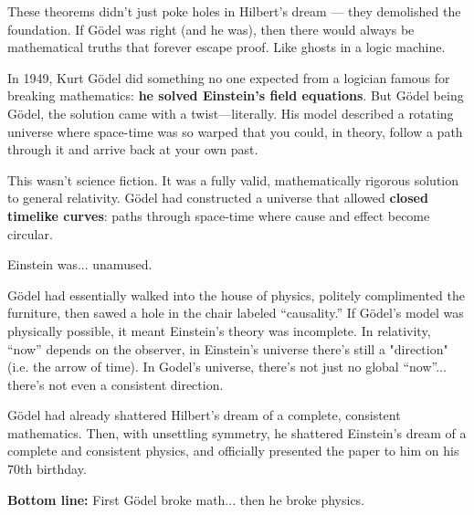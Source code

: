 These theorems didn’t just poke holes in Hilbert’s dream — they demolished the foundation. If Gödel was right (and he was), then there would always be mathematical truths that forever escape proof. Like ghosts in a logic machine.

\medskip

\begin{tcolorbox}[colback=blue!5!white, colframe=blue!50!black,
  title={Historical Sidebar: Gödel’s Time-Twisting Universe}]
  
  In 1949, Kurt Gödel did something no one expected from a logician famous for breaking mathematics:  
  \textbf{he solved Einstein’s field equations}. But Gödel being Gödel, the solution came with a twist—literally. His model described a rotating universe where space-time was so warped that you could, in theory, follow a path through it and arrive back at your own past.
  
  \medskip
  
  This wasn’t science fiction. It was a fully valid, mathematically rigorous solution to general relativity. Gödel had constructed a universe that allowed \textbf{closed timelike curves}: paths through space-time where cause and effect become circular.
  
  \medskip
  
  Einstein was... unamused.

  \medskip
  
  Gödel had essentially walked into the house of physics, politely complimented the furniture, then sawed a hole in the chair labeled ``causality.'' If Gödel’s model was physically possible, it meant Einstein's theory was incomplete.  In relativity, ``now'' depends on the observer, in Einstein's universe there's still a "direction" (i.e. the arrow of time). In Godel's universe, there’s not just no global “now”... there’s not even a consistent direction.
  
  \medskip

  Gödel had already shattered Hilbert’s dream of a complete, consistent mathematics. Then, with unsettling symmetry, he shattered Einstein's dream of a complete and consistent physics, and officially presented the paper to him on his 70th birthday.

  \medskip

  \textbf{Bottom line:} First Gödel broke math... then he broke physics.

  
\end{tcolorbox}

\vspace{1em}


